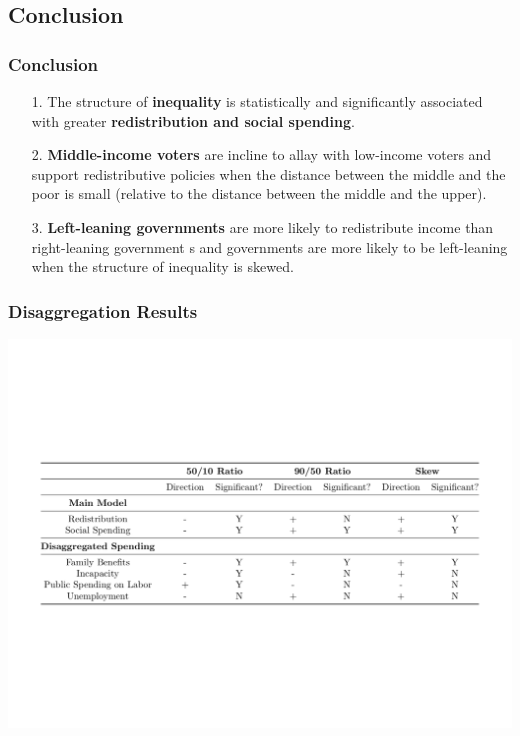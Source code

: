 \documentclass{beamer}
\begin{document}
\begin{frame}
\begin{itemize}
\begin{frame}
\subsection{Conclusion}
\frametitle{Conclusion}
\begin{itemize}
\item[1.] The structure of \textbf{inequality} is statistically and significantly associated with greater \textbf{redistribution and social spending}.
\medskip
\medskip
\medskip
\item[2.] \textbf{Middle-income voters} are incline to allay with low-income voters and support redistributive policies when the distance between the middle and the poor is small (relative to the distance between the middle and the upper).
\medskip
\medskip
\medskip
\item[3.] \textbf{Left-leaning governments} are more likely to redistribute income than right-leaning government s and  governments are more likely to be left-leaning when the structure of inequality is skewed.
\end{itemize}
\end{frame}

\begin{frame}
\frametitle{Disaggregation Results}
\begin{center}
\includegraphics[scale=0.4]{robustnesscheck1}
\end{center}
\end{frame}


\end{itemize}
\end{frame}
\end{document}
